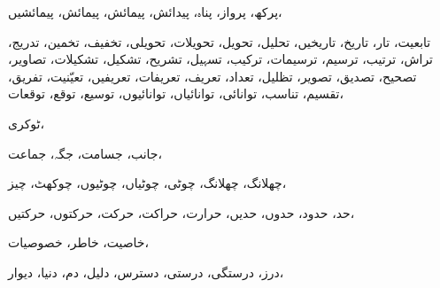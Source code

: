                                     پرکھ،            پرواز،            پناہ،            پیدائش،            پیمائش،            پیمائش،            پیمائشیں،
                                     
                                                تابعیت،            تار،            تاریخ،            تاریخیں،            تحلیل،            تحویل،            تحویلات،            تحویلی،            تخفیف،            تخمین،            تدریج،            تراش،            ترتیب،            ترسیم،            ترسیمات،            ترکیب،            تسہیل،            تشریح،            تشکیل،            تشکیلات،            تصاویر،            تصحیح،            تصدیق،            تصویر،            تظلیل،            تعداد،            تعریف،            تعریفات،            تعریفیں،            تعیّنیت،            تفریق،            تقسیم،            تناسب،            توانائی،            توانائیاں،            توانائیوں،            توسیع،            توقع،            توقعات،
                                                
                                                            ٹوکری،            
                                                            
                                                            جانب،            جسامت،            جگہ،            جماعت،            
                                                            
                                                            چھلانگ،            چھلانگ،            چوٹی،            چوٹیاں،            چوٹیوں،            چوکھٹ،            چیز،            
                                                            
                                                            حد،            حدود،            حدوں،            حدیں،            حرارت،            حراکت،            حرکت،            حرکتوں،            حرکتیں،
                                                            
                                                                        خاصیت،            خاطر،            خصوصیات،
                                                                        
                                                                                    درز،            درستگی،            درستی،            دسترس،            دلیل،            دم،            دنیا،            دیوار،
                                                                                    
